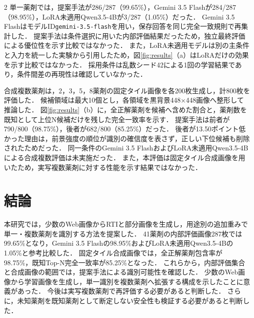 \documentclass[10pt,a4paper]{article}
\newcommand{\RTI}{RTI}
\begin{document}
\begin{multicols}{2}
単一薬剤では，提案手法が286/287（99.65\%），Gemini 3.5 Flashが284/287（98.95\%），LoRA未適用Qwen3.5-4Bが3/287（1.05\%）だった．
Gemini 3.5 FlashはモデルID\texttt{gemini-3.5-flash}を用い，保存回答を同じ完全一致規則で再集計した．
提案手法は条件選択に用いた内部評価結果だったため，独立最終評価による優位性を示す比較ではなかった．
また，LoRA未適用モデルは別の主条件と入力を統一した実験から引用したため，図\ref{fig:results}（a）はLoRAだけの効果を示す比較ではなかった．
採用条件は乱数シード42による1回の学習結果であり，条件間差の再現性は確認していなかった．

合成複数薬剤は，2，3，5，8薬剤の固定タイル画像を各200枚生成し，計800枚を評価した．
候補領域は最大10個とし，各領域を黒背景448×448画像へ整形して推論した．
図\ref{fig:results}（b）に，全正解薬剤を候補へ含めた割合と，薬剤数を既知として上位N候補だけを残した完全一致率を示す．
提案手法は前者が790/800（98.75\%），後者が682/800（85.25\%）だった．
後者が13.50ポイント低かった理由は，前景強度の順位が識別の確信度を表さず，正しい下位候補も削除されたためだった．
同一条件のGemini 3.5 FlashおよびLoRA未適用Qwen3.5-4Bによる合成複数評価は未実施だった．
また，本評価は固定タイル合成画像を用いたため，実写複数薬剤に対する性能を示す結果ではなかった．

\section{結論}

本研究では，少数のWeb画像から\RTI と部分画像を生成し，用途別の追加重みで単一・複数薬剤を識別する方法を提案した．
41薬剤の内部評価画像287枚では99.65\%となり，Gemini 3.5 Flashの98.95\%およびLoRA未適用Qwen3.5-4Bの1.05\%と参考比較した．
固定タイル合成画像では，全正解薬剤包含率が98.75\%，既知Top-N完全一致率が85.25\%となった．
これらから，内部評価集合と合成画像の範囲では，提案手法による識別可能性を確認した．
少数のWeb画像から学習画像を生成し，単一識別を複数薬剤へ拡張する構成を示したことに意義があった．
今後は実写複数薬剤で再評価する必要があると判断した．
さらに，未知薬剤を既知薬剤として断定しない安全性も検証する必要があると判断した．




\end{multicols}
\end{document}
